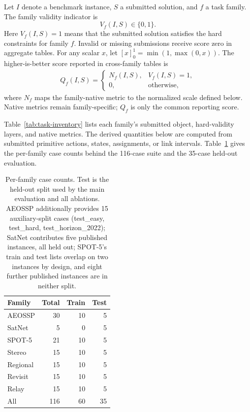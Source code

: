 \documentclass[11pt]{article}
\begin{document}
Let \(I\) denote a benchmark instance, \(S\) a submitted solution, and \(f\) a task family. The family validity indicator is
\[
  V_f(I,S)\in\{0,1\}.
\]
Here \(V_f(I,S)=1\) means that the submitted solution satisfies the hard constraints for family \(f\). Invalid or missing submissions receive score zero in aggregate tables. For any scalar \(x\), let \([x]_0^1=\min(1,\max(0,x))\). The higher-is-better score reported in cross-family tables is
\[
  \begin{aligned}
  Q_f(I,S)=
  \begin{cases}
    N_f(I,S), & V_f(I,S)=1,\\
    0, & \text{otherwise},
  \end{cases}
  \end{aligned}
\]
where \(N_f\) maps the family-native metric to the normalized scale defined below. Native metrics remain family-specific; \(Q_f\) is only the common reporting score.

Table~\ref{tab:task-inventory} lists each family's submitted object, hard-validity layers, and native metrics. The derived quantities below are computed from submitted primitive actions, states, assignments, or link intervals. Table~\ref{tab:case-splits} gives the per-family case counts behind the 116-case suite and the 35-case held-out evaluation.

\begin{table}[t]
\centering
\footnotesize
\begin{tabular}{lrrr}
\hline
\textbf{Family} & \textbf{Total} & \textbf{Train} & \textbf{Test} \\
\hline
AEOSSP & 30 & 10 & 5 \\
SatNet & 5 & 0 & 5 \\
SPOT-5 & 21 & 10 & 5 \\
Stereo & 15 & 10 & 5 \\
Regional & 15 & 10 & 5 \\
Revisit & 15 & 10 & 5 \\
Relay & 15 & 10 & 5 \\
\hline
All & 116 & 60 & 35 \\
\hline
\end{tabular}
\caption{Per-family case counts. Test is the held-out split used by the main evaluation and all ablations. AEOSSP additionally provides 15 auxiliary-split cases (test\_easy, test\_hard, test\_horizon\_2022); SatNet contributes five published instances, all held out; SPOT-5's train and test lists overlap on two instances by design, and eight further published instances are in neither split.}
\label{tab:case-splits}
\end{table}
\end{document}
